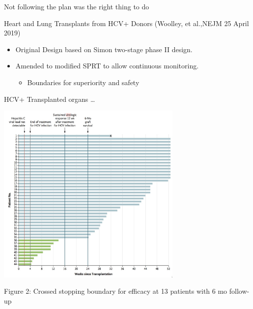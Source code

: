 \documentclass[ignorenonframetext,]{beamer}
\providecommand{\tightlist}{%
  \setlength{\itemsep}{0pt}\setlength{\parskip}{0pt}}
\begin{document}
\begin{frame}{%
\protect\hypertarget{not-following-the-plan-was-the-right-thing-to-do}{%
Not following the plan was the right thing to do}}

Heart and Lung Transplants from HCV+ Donors (Woolley, et al.,NEJM 25
April 2019)

\begin{itemize}
\item
  Original Design based on Simon two-stage phase II design.
\item
  Amended to modified SPRT to allow continuous monitoring.

  \begin{itemize}
  \tightlist
  \item
    Boundaries for superiority and safety
  \end{itemize}
\end{itemize}

\end{frame}

\begin{frame}{%
\protect\hypertarget{hcv-transplanted-organs}{%
HCV+ Transplanted organs \ldots}}

\includegraphics[width=0.68\textwidth,height=\textheight]{./figures/hcv_monitoring.jpeg}

Figure 2: Crossed stopping boundary for efficacy at 13 patients with 6
mo follow-up

\end{frame}
\end{document}
